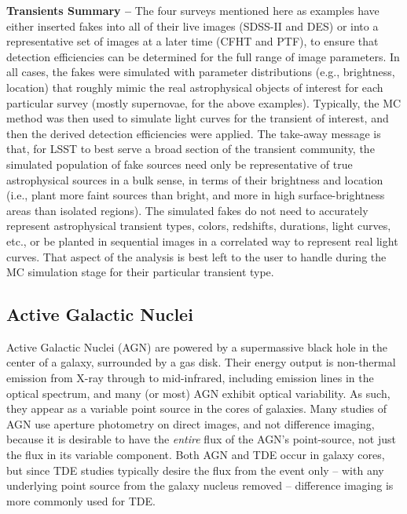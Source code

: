 \documentclass[DM,lsstdraft,toc]{lsstdoc}
\begin{document}
{\bf Transients Summary --} The four surveys mentioned here as examples have either inserted fakes into all of their live images (SDSS-II and DES) or into a representative set of images at a later time (CFHT and PTF), to ensure that detection efficiencies can be determined for the full range of image parameters. In all cases, the fakes were simulated with parameter distributions (e.g., brightness, location) that roughly mimic the real astrophysical objects of interest for each particular survey (mostly supernovae, for the above examples). Typically, the MC method was then used to simulate light curves for the transient of interest, and then the derived detection efficiencies were applied. The take-away message is that, for LSST to best serve a broad section of the transient community, the simulated population of fake sources need only be representative of true astrophysical sources in a bulk sense, in terms of their brightness and location (i.e., plant more faint sources than bright, and more in high surface-brightness areas than isolated regions). The simulated fakes do not need to accurately represent astrophysical transient types, colors, redshifts, durations, light curves, etc., or be planted in sequential images in a correlated way to represent real light curves. That aspect of the analysis is best left to the user to handle during the MC simulation stage for their particular transient type. 

\subsection{Active Galactic Nuclei}\label{ssec:sci_agn}

Active Galactic Nuclei (AGN) are powered by a supermassive black hole in the center of a galaxy, surrounded by a gas disk. Their energy output is non-thermal emission from X-ray through to mid-infrared, including emission lines in the optical spectrum, and many (or most) AGN exhibit optical variability. As such, they appear as a variable point source in the cores of galaxies. Many studies of AGN use aperture photometry on direct images, and not difference imaging, because it is desirable to have the {\it entire} flux of the AGN's point-source, not just the flux in its variable component. Both AGN and TDE occur in galaxy cores, but since TDE studies typically desire the flux from the event only -- with any underlying point source from the galaxy nucleus removed -- difference imaging is more commonly used for TDE. 
\end{document}
